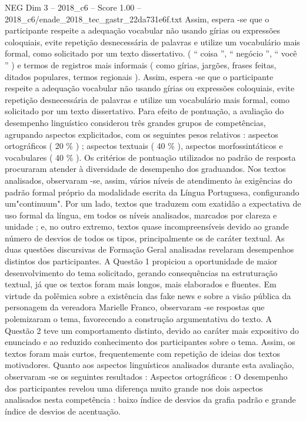 \begin{textsample}{NEG Dim 3 – 2018\_c6 – Score 1.00 – 2018\_c6/enade\_2018\_tec\_gastr\_22da731e6f.txt}
Assim, espera -se que o participante respeite a adequação vocabular não usando gírias ou expressões coloquiais, evite repetição desnecessária de palavras e utilize um vocabulário mais formal, como solicitado por um texto dissertativo. ( “ coisa ”, “ negócio ”, “ você ” ) e termos de registros mais informais ( como gírias, jargões, frases feitas, ditados populares, termos regionais ).
Assim, espera -se que o participante respeite a adequação vocabular não usando gírias ou expressões coloquiais, evite repetição desnecessária de palavras e utilize um vocabulário mais formal, como solicitado por um texto dissertativo.
Para efeito de pontuação, a avaliação do desempenho linguístico considerou três grandes grupos de competências, agrupando aspectos explicitados, com os seguintes pesos relativos : aspectos ortográficos ( 20 \% ) ; aspectos textuais ( 40 \% ), aspectos morfossintáticos e vocabulares ( 40 \% ).
Os critérios de pontuação utilizados no padrão de resposta procuraram atender à diversidade de desempenho dos graduandos.
Nos textos analisados, observaram -se, assim, vários níveis de atendimento às exigências do padrão formal próprio da modalidade escrita da Língua Portuguesa, configurando um"continuum".
Por um lado, textos que traduzem com exatidão a expectativa de uso formal da língua, em todos os níveis analisados, marcados por clareza e unidade ; e, no outro extremo, textos quase incompreensíveis devido ao grande número de desvios de todos os tipos, principalmente os de caráter textual.
As duas questões discursivas de Formação Geral analisadas revelaram desempenhos distintos dos participantes.
A Questão 1 propiciou a oportunidade de maior desenvolvimento do tema solicitado, gerando consequências na estruturação textual, já que os textos foram mais longos, mais elaborados e fluentes.
Em virtude da polêmica sobre a existência das fake news e sobre a visão pública da personagem da vereadora Marielle Franco, observaram -se respostas que polemizaram o tema, favorecendo a construção argumentativa do texto.
A Questão 2 teve um comportamento distinto, devido ao caráter mais expositivo do enunciado e ao reduzido conhecimento dos participantes sobre o tema.
Assim, os textos foram mais curtos, frequentemente com repetição de ideias dos textos motivadores.
Quanto aos aspectos linguísticos analisados durante esta avaliação, observaram -se os seguintes resultados : Aspectos ortográficos : O desempenho dos participantes revelou uma diferença muito grande nos dois aspectos analisados nesta competência : baixo índice de desvios da grafia padrão e grande índice de desvios de acentuação.

\end{textsample}
